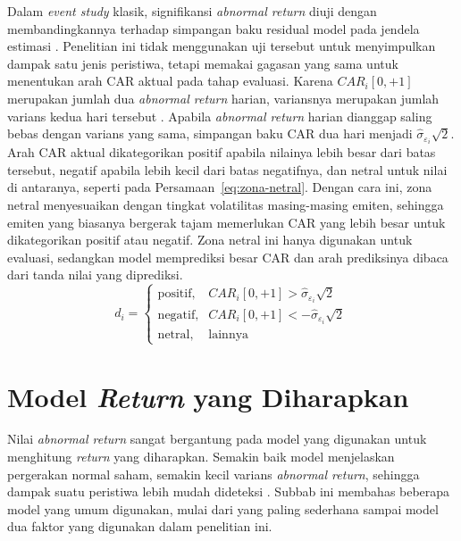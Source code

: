 Dalam \emph{event study} klasik, signifikansi \emph{abnormal return} diuji dengan membandingkannya terhadap simpangan baku residual model pada jendela estimasi \autocite{mackinlay1997}. Penelitian ini tidak menggunakan uji tersebut untuk menyimpulkan dampak satu jenis peristiwa, tetapi memakai gagasan yang sama untuk menentukan arah CAR aktual pada tahap evaluasi. Karena $CAR_i[0,+1]$ merupakan jumlah dua \emph{abnormal return} harian, variansnya merupakan jumlah varians kedua hari tersebut \autocite{mackinlay1997}. Apabila \emph{abnormal return} harian dianggap saling bebas dengan varians yang sama, simpangan baku CAR dua hari menjadi $\hat{\sigma}_{\varepsilon_i}\sqrt{2}$. Arah CAR aktual dikategorikan positif apabila nilainya lebih besar dari batas tersebut, negatif apabila lebih kecil dari batas negatifnya, dan netral untuk nilai di antaranya, seperti pada Persamaan~\ref{eq:zona-netral}. Dengan cara ini, zona netral menyesuaikan dengan tingkat volatilitas masing-masing emiten, sehingga emiten yang biasanya bergerak tajam memerlukan CAR yang lebih besar untuk dikategorikan positif atau negatif. Zona netral ini hanya digunakan untuk evaluasi, sedangkan model memprediksi besar CAR dan arah prediksinya dibaca dari tanda nilai yang diprediksi.
\begin{equation}
d_{i} =
\begin{cases}
\text{positif}, & CAR_i[0,+1] > \hat{\sigma}_{\varepsilon_i}\sqrt{2} \\
\text{negatif}, & CAR_i[0,+1] < -\hat{\sigma}_{\varepsilon_i}\sqrt{2} \\
\text{netral}, & \text{lainnya}
\end{cases}
\label{eq:zona-netral}
\end{equation}

\section{Model \emph{Return} yang Diharapkan}
\label{sec:model-return}

Nilai \emph{abnormal return} sangat bergantung pada model yang digunakan untuk menghitung \emph{return} yang diharapkan. Semakin baik model menjelaskan pergerakan normal saham, semakin kecil varians \emph{abnormal return}, sehingga dampak suatu peristiwa lebih mudah dideteksi \autocite{mackinlay1997}. Subbab ini membahas beberapa model yang umum digunakan, mulai dari yang paling sederhana sampai model dua faktor yang digunakan dalam penelitian ini.

